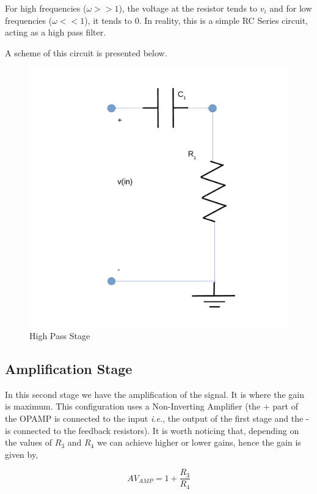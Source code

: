 For high frequencies ($\omega >> 1$), the voltage at the resistor tends to $v_i$ and for low frequencies ($\omega << 1$), it tends to 0.
In reality, this is a simple RC Series circuit, acting as a high pass filter.

A scheme of this circuit is presented below.


\begin{figure}[h]
    \centering
    \includegraphics[scale=0.35]{high_pass_l5_old.pdf}
    \caption{High Pass Stage}
    \label{fig:high_pass_stage_old}
\end{figure}

\subsection{Amplification Stage}

In this second stage we have the amplification of the signal. It is where the gain is maximum. This configuration uses a Non-Inverting Amplifier (the + part of the OPAMP is connected to the input \textit{i.e.}, the output of the first stage and the - is connected to the feedback resistors). 
It is worth noticing that, depending on the values of $R_3$ and $R_4$ we can achieve higher or lower gains, hence the gain is given by,

\begin{equation}
    AV_{AMP}=1+\frac{R_3}{R_4}
\end{equation}


